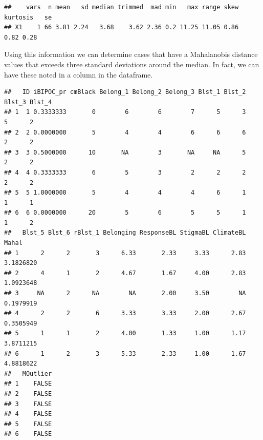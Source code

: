 \documentclass[
  11pt,
]{book}
\newenvironment{Shaded}{\begin{snugshade}}{\end{snugshade}}
\newcommand{\CommentTok}[1]{\textcolor[rgb]{0.37,0.37,0.37}{\textit{#1}}}
\newcommand{\ConstantTok}[1]{\textcolor[rgb]{0.37,0.37,0.37}{#1}}
\newcommand{\DecValTok}[1]{\textcolor[rgb]{0.06,0.06,0.06}{#1}}
\newcommand{\FunctionTok}[1]{\textcolor[rgb]{0.27,0.27,0.27}{\textbf{#1}}}
\newcommand{\NormalTok}[1]{#1}
\newcommand{\OtherTok}[1]{\textcolor[rgb]{0.37,0.37,0.37}{#1}}
\newcommand{\SpecialCharTok}[1]{\textcolor[rgb]{0.43,0.43,0.43}{\textbf{#1}}}
\begin{document}
\begin{verbatim}
##    vars  n mean   sd median trimmed  mad min   max range skew kurtosis   se
## X1    1 66 3.81 2.24   3.68    3.62 2.36 0.2 11.25 11.05 0.86     0.82 0.28
\end{verbatim}

Using this information we can determine cases that have a Mahalanobis distance values that exceeds three standard deviations around the median. In fact, we can have these noted in a column in the dataframe.

\begin{Shaded}
\end{Shaded}

\begin{verbatim}
##   ID iBIPOC_pr cmBlack Belong_1 Belong_2 Belong_3 Blst_1 Blst_2 Blst_3 Blst_4
## 1  1 0.3333333       0        6        6        7      5      3      5      2
## 2  2 0.0000000       5        4        4        6      6      6      2      2
## 3  3 0.5000000      10       NA        3       NA     NA      5      2      2
## 4  4 0.3333333       6        5        3        2      2      2      2      2
## 5  5 1.0000000       5        4        4        4      6      1      1      1
## 6  6 0.0000000      20        5        6        5      5      1      1      2
##   Blst_5 Blst_6 rBlst_1 Belonging ResponseBL StigmaBL ClimateBL     Mahal
## 1      2      2       3      6.33       2.33     3.33      2.83 3.1826820
## 2      4      1       2      4.67       1.67     4.00      2.83 1.0923648
## 3     NA      2      NA        NA       2.00     3.50        NA 0.1979919
## 4      2      2       6      3.33       3.33     2.00      2.67 0.3505949
## 5      1      1       2      4.00       1.33     1.00      1.17 3.8711215
## 6      1      2       3      5.33       2.33     1.00      1.67 4.8818622
##   MOutlier
## 1    FALSE
## 2    FALSE
## 3    FALSE
## 4    FALSE
## 5    FALSE
## 6    FALSE
\end{verbatim}
\end{document}
